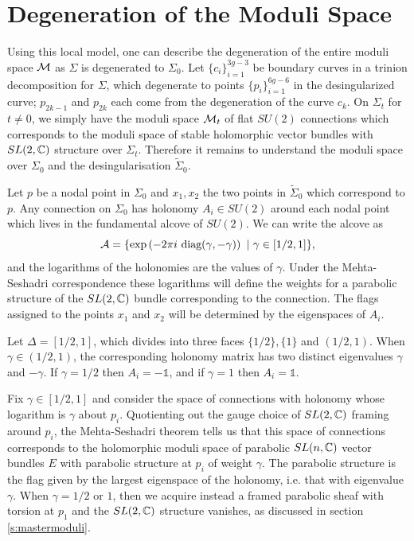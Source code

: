 \section{Degeneration of the Moduli Space}
	Using this local model, one can describe the degeneration of the entire moduli space $\mathcal{M}$ as $\Sigma$ is degenerated to $\Sigma_0$. Let $\{c_i\}_{i=1}^{3g-3}$ be boundary curves in a trinion decomposition for $\Sigma$, which degenerate to points $\{p_i\}_{i=1}^{6g-6}$ in the desingularized curve; $p_{2k-1}$ and $p_{2k}$ each come from the degeneration of the curve $c_k$. On $\Sigma_t$ for $t\neq 0$, we simply have the moduli space $\mathcal{M}_t$ of flat $SU(2)$ connections which corresponds to the moduli space of stable holomorphic vector bundles with $SL(2,\mathbb{C})$ structure over $\Sigma_t$. Therefore it remains to understand the moduli space over $\Sigma_0$ and the desingularisation $\tilde{\Sigma}_0$. 
	
	Let $p$ be a nodal point in $\Sigma_0$ and $x_1,x_2$ the two points in $\tilde{\Sigma}_0$ which correspond to $p$. Any connection on $\Sigma_0$ has holonomy $A_i\in SU(2)$ around each nodal point which lives in the fundamental alcove of $SU(2)$. We can write the alcove as
	\begin{equation}
		\mathcal{A} = \{\exp\left(
		-2\pi i ~\text{diag}(\gamma, -\gamma)
		\right)~|~ \gamma \in[1/2,1]\},
	\end{equation}
	and the logarithms of the holonomies are the values of $\gamma$. Under the Mehta-Seshadri correspondence these logarithms will define the weights for a parabolic structure of the $SL(2,\mathbb{C})$ bundle corresponding to the connection. The flags assigned to the points $x_1$ and $x_2$ will be determined by the eigenspaces of $A_i$.
	
	Let $\Delta = [1/2,1]$, which divides into three faces $\{1/2\}, \{1\}$ and $(1/2,1)$. When $\gamma \in (1/2,1)$, the corresponding holonomy matrix has two distinct eigenvalues $\gamma$ and $-\gamma$.  If $\gamma=1/2$ then $A_i = -\mathds{1}$, and if $\gamma = 1$ then $A_i = \mathds{1}$.
	
	Fix $\gamma \in [1/2,1]$ and consider the space of connections with holonomy whose logarithm is $\gamma$ about $p_i$. Quotienting out the gauge choice of $SL(2,\mathbb{C})$ framing around $p_i$, the Mehta-Seshadri theorem \cite{mehta_moduli_1980} tells us that this space of connections corresponds to the holomorphic moduli space of parabolic $SL(n,\mathbb{C})$ vector bundles $E$ with parabolic structure at $p_i$ of weight $\gamma$. The parabolic structure is the flag given by the largest eigenspace of the holonomy, i.e. that with eigenvalue $\gamma$. When $\gamma = 1/2$ or $1$, then we acquire instead a framed parabolic sheaf with torsion at $p_1$ and the $SL(2,\mathbb{C})$ structure vanishes, as discussed in section \ref{s:mastermoduli}.
		
